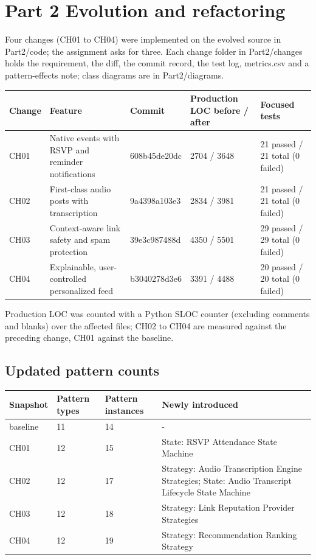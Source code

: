 \documentclass[11pt,a4paper]{article}
\begin{document}
\section{Part 2 Evolution and refactoring}
Four changes (CH01 to CH04) were implemented on the evolved source in Part2/code; the assignment asks for three. Each change folder in Part2/changes holds the requirement, the diff, the commit record, the test log, metrics.csv and a pattern-effects note; class diagrams are in Part2/diagrams.

{\small\begin{tabularx}{\linewidth}{llllX}\toprule
Change & Feature & Commit & Production LOC before / after & Focused tests\\\midrule
CH01 & Native events with RSVP and reminder notifications & 608b45de20dc & 2704 / 3648 & 21 passed / 21 total (0 failed) \\
CH02 & First-class audio posts with transcription & 9a4398a103e3 & 2834 / 3981 & 21 passed / 21 total (0 failed) \\
CH03 & Context-aware link safety and spam protection & 39e3c987488d & 4350 / 5501 & 29 passed / 29 total (0 failed) \\
CH04 & Explainable, user-controlled personalized feed & b3040278d3e6 & 3391 / 4488 & 20 passed / 20 total (0 failed)\\
\bottomrule\end{tabularx}}

Production LOC was counted with a Python SLOC counter (excluding comments and blanks) over the affected files; CH02 to CH04 are measured against the preceding change, CH01 against the baseline.

\subsection{Updated pattern counts}
{\small\begin{tabularx}{\linewidth}{lllX}\toprule
Snapshot & Pattern types & Pattern instances & Newly introduced\\\midrule
baseline & 11 & 14 & - \\
CH01 & 12 & 15 & State: RSVP Attendance State Machine \\
CH02 & 12 & 17 & Strategy: Audio Transcription Engine Strategies; State: Audio Transcript Lifecycle State Machine \\
CH03 & 12 & 18 & Strategy: Link Reputation Provider Strategies \\
CH04 & 12 & 19 & Strategy: Recommendation Ranking Strategy\\
\bottomrule\end{tabularx}}
\end{document}
